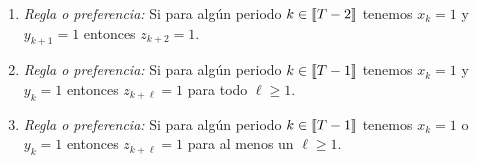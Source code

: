 \documentclass[ a4paper, twoside, 11pt]{article}
\begin{document}
\begin{problem}
\begin{enumerate}[label=\alph*)]
\item \emph{Regla o preferencia:} Si para alg\'un periodo $k \in \llbracket T-2 \rrbracket$ tenemos $x_k = 1$ y $y_{k+1} = 1$ entonces $z_{k+2} = 1$. 

\item \emph{Regla o preferencia:} Si para alg\'un periodo $k \in \llbracket T-1 \rrbracket$ tenemos $x_k = 1$ y $y_{k} = 1$ entonces $z_{k+\ell} = 1$ para todo $\ell \geq 1$. 

\item \emph{Regla o preferencia:} Si para alg\'un periodo $k \in \llbracket T-1 \rrbracket$ tenemos $x_k = 1$ o $y_{k} = 1$ entonces $z_{k+ \ell} = 1$ para al menos un $\ell \geq 1$. 

\end{enumerate}
\QED

\end{problem}
\vspace{\baselineskip}
\end{document}
